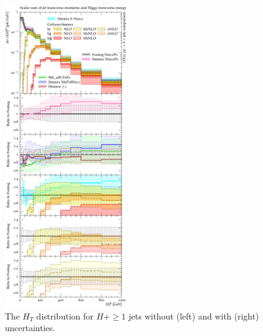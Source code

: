 \begin{figure}[t!]
  \includegraphics[width=0.47\textwidth]{figures/hjetscomp_HT_all.pdf}
  \caption{
    The $H_T$ distribution for $H+\ge1$ jets 
    without (left) and with (right) uncertainties.
    \label{fig:hjetscomp:results:mobs:HT_all}
  }
\end{figure}

